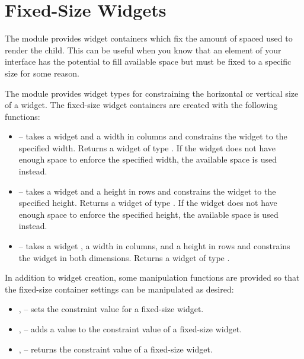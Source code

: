 \section{Fixed-Size Widgets}
\label{sec:fixed}

The  module provides widget containers which fix the amount
of spaced used to render the child.  This can be useful when you know
that an element of your interface has the potential to fill available
space but must be fixed to a specific size for some reason.

The module provides widget types for constraining the horizontal or
vertical size of a widget.  The fixed-size widget containers are
created with the following functions:

\begin{itemize}
\item {} -- takes a widget  and a width in
  columns and constrains the widget to the specified width.  Returns a
  widget of type .  If the  widget
  does not have enough space to enforce the specified width, the
  available space is used instead.
\item {} -- takes a widget  and a height in rows
  and constrains the widget to the specified height.  Returns a widget
  of type .  If the  widget does not
  have enough space to enforce the specified height, the available
  space is used instead.
\item {} -- takes a widget , a width in
  columns, and a height in rows and constrains the widget in both
  dimensions.  Returns a widget of type .
\end{itemize}

In addition to widget creation, some manipulation functions are
provided so that the fixed-size container settings can be manipulated
as desired:

\begin{itemize}
\item {},  -- sets the constraint value for
  a fixed-size widget.
\item {},  -- adds a value to the
  constraint value of a fixed-size widget.
\item {},  -- returns the constraint
  value of a fixed-size widget.
\end{itemize}

